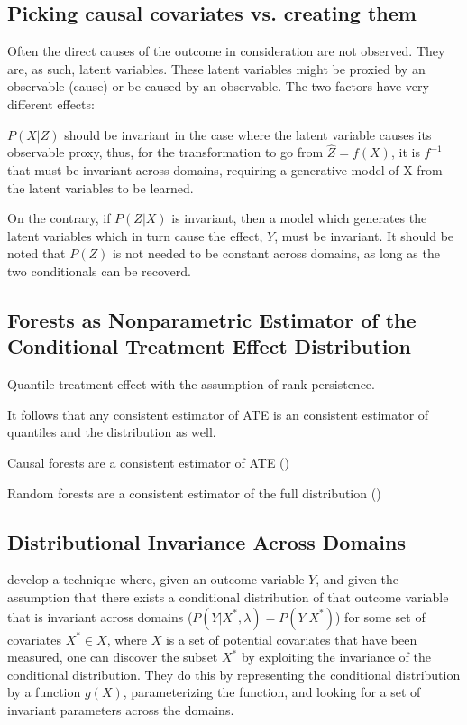 \documentclass[a4paper,12pt]{article}
\begin{document}
\subsection*{Picking causal covariates vs. creating them}

Often the direct causes of the outcome in consideration are not observed. They are, as such, latent variables. These latent variables might be proxied by an observable (cause) or be caused by an observable. The two factors have very different effects: 

$P(X |Z)$ should be invariant in the case where the latent variable causes its observable proxy, thus, for the transformation to go from $\hat{Z} = f(X)$, it is $f^{-1}$ that must be invariant across domains, requiring a generative model of X from the latent variables to be learned. 

On the contrary, if $P(Z | X)$ is invariant, then a model which generates the latent variables which in turn cause the effect, $Y$, must be invariant. It should be noted that $P(Z)$ is not needed to be constant across domains, as long as the two conditionals can be recoverd. 



\subsection*{Forests as Nonparametric Estimator of the Conditional Treatment Effect Distribution}

Quantile treatment effect with the assumption of rank persistence. 

It follows that any consistent estimator of ATE is an consistent estimator of quantiles and the distribution as well. 

Causal forests are a consistent estimator of ATE (\cite{})

Random forests are a consistent estimator of the full distribution (\cite{})


\subsection*{Distributional Invariance Across Domains}

\cite{Peters2015} develop a technique where, given an outcome variable $Y$, and given the assumption that there exists a conditional distribution of that outcome variable that is invariant across domains ($P(Y | X^*, \lambda) = P(Y | X^*)$) for some set of covariates $X^* \in X$, where $X$ is a set of potential covariates that have been measured, one can discover the subset $X^*$ by exploiting the invariance of the conditional distribution. They do this by representing the conditional distribution by a function $g(X)$, parameterizing the function, and looking for a set of invariant parameters across the domains. 
\end{document}
